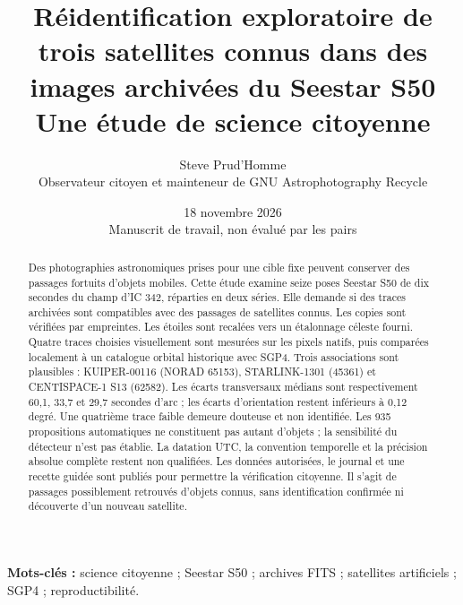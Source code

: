 \documentclass[11pt,letterpaper]{article}
\title{Réidentification exploratoire de trois satellites connus dans des images archivées du Seestar S50\\[.4em]\large Une étude de science citoyenne}
\author{Steve Prud’Homme\\\small Observateur citoyen et mainteneur de GNU Astrophotography Recycle}
\date{18 novembre 2026\\\small Manuscrit de travail, non évalué par les pairs}
\begin{document}
\maketitle
\begin{abstract}
Des photographies astronomiques prises pour une cible fixe peuvent conserver des passages fortuits d’objets mobiles.
Cette étude examine seize poses Seestar S50 de dix secondes du champ d’IC 342, réparties en deux séries.
Elle demande si des traces archivées sont compatibles avec des passages de satellites connus.
Les copies sont vérifiées par empreintes. Les étoiles sont recalées vers un étalonnage céleste fourni.
Quatre traces choisies visuellement sont mesurées sur les pixels natifs, puis comparées localement à un catalogue orbital historique avec SGP4.
Trois associations sont plausibles : KUIPER-00116 (NORAD 65153), STARLINK-1301 (45361) et CENTISPACE-1 S13 (62582).
Les écarts transversaux médians sont respectivement 60,1, 33,7 et 29,7 secondes d’arc ; les écarts d’orientation restent inférieurs à 0,12 degré.
Une quatrième trace faible demeure douteuse et non identifiée.
Les 935 propositions automatiques ne constituent pas autant d’objets ; la sensibilité du détecteur n’est pas établie.
La datation UTC, la convention temporelle et la précision absolue complète restent non qualifiées.
Les données autorisées, le journal et une recette guidée sont publiés pour permettre la vérification citoyenne.
Il s’agit de passages possiblement retrouvés d’objets connus, sans identification confirmée ni découverte d’un nouveau satellite.
\end{abstract}
\noindent\textbf{Mots-clés :} science citoyenne ; Seestar S50 ; archives FITS ; satellites artificiels ; SGP4 ; reproductibilité.
\end{document}
